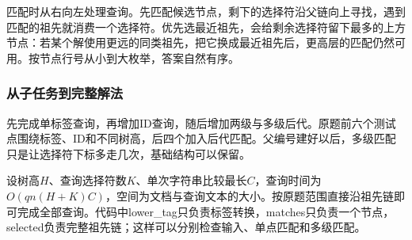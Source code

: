 \documentclass[UTF8,11pt,a4paper,fontset=none]{ctexart}
\begin{document}
匹配时从右向左处理查询。先匹配候选节点，剩下的选择符沿父链向上寻找，遇到匹配的祖先就消费一个选择符。优先选最近祖先，会给剩余选择符留下最多的上方节点：若某个解使用更远的同类祖先，把它换成最近祖先后，更高层的匹配仍然可用。按节点行号从小到大枚举，答案自然有序。

\subsubsection{从子任务到完整解法}
先完成单标签查询，再增加ID查询，随后增加两级与多级后代。原题前六个测试点围绕标签、ID和不同树高，后四个加入后代匹配。父编号建好以后，多级匹配只是让选择符下标多走几次，基础结构可以保留。

设树高$H$、查询选择符数$K$、单次字符串比较最长$C$，查询时间为$O(qn(H+K)C)$，空间为文档与查询文本的大小。按原题范围直接沿祖先链即可完成全部查询。代码中lower\_tag只负责标签转换，matches只负责一个节点，selected负责完整祖先链；这样可以分别检查输入、单点匹配和多级匹配。
\end{document}
